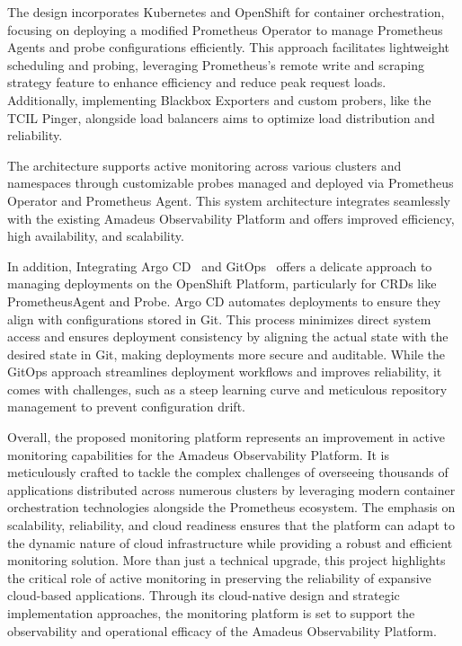 The design incorporates Kubernetes and OpenShift for container orchestration, focusing on deploying a modified Prometheus Operator to manage Prometheus Agents and probe configurations efficiently. This approach facilitates lightweight scheduling and probing, leveraging Prometheus's remote write and scraping strategy feature to enhance efficiency and reduce peak request loads\parencite{plotkaIntroducingPrometheusAgent2021}. Additionally, implementing Blackbox Exporters and custom probers, like the \ac{TCIL} Pinger, alongside load balancers aims to optimize load distribution and reliability. 

The architecture supports active monitoring across various clusters and namespaces through customizable probes managed and deployed via Prometheus Operator and Prometheus Agent. This system architecture integrates seamlessly with the existing Amadeus Observability Platform and offers improved efficiency, high availability, and scalability. 

In addition, Integrating Argo CD~\parencite{ArgoCDDeclarative} and GitOps~\parencite{WeaveworksWeavegitopsWeave} offers a delicate approach to managing deployments on the OpenShift Platform, particularly for \ac{CRD}s like PrometheusAgent and Probe. Argo CD automates deployments to ensure they align with configurations stored in Git. This process minimizes direct system access and ensures deployment consistency by aligning the actual state with the desired state in Git, making deployments more secure and auditable. While the GitOps approach streamlines deployment workflows and improves reliability, it comes with challenges, such as a steep learning curve and meticulous repository management to prevent configuration drift. 

Overall, the proposed monitoring platform represents an improvement in active monitoring capabilities for the Amadeus Observability Platform. It is meticulously crafted to tackle the complex challenges of overseeing thousands of applications distributed across numerous clusters by leveraging modern container orchestration technologies alongside the Prometheus ecosystem. The emphasis on scalability, reliability, and cloud readiness ensures that the platform can adapt to the dynamic nature of cloud infrastructure while providing a robust and efficient monitoring solution. More than just a technical upgrade, this project highlights the critical role of active monitoring in preserving the reliability of expansive cloud-based applications. Through its cloud-native design and strategic implementation approaches, the monitoring platform is set to support the observability and operational efficacy of the Amadeus Observability Platform. 

